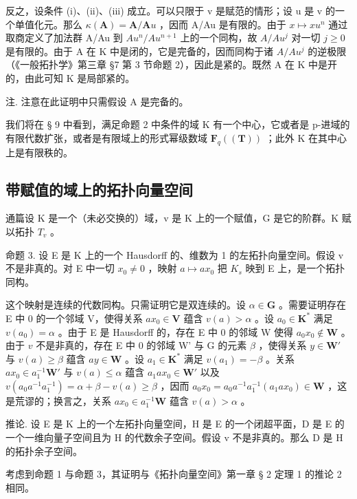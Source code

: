 反之，设条件 (i)、(ii)、(iii) 成立。可以只限于 v 是赋范的情形；设 u 是 v 的一个单值化元。那么 \(\kappa(\mathbf{A}) = \mathbf{A}/\mathbf{A}u\) ，因而 A/Au 是有限的。由于 \(x \mapsto xu^{n}\) 通过取商定义了加法群 A/Au 到 \(Au^{n}/Au^{n+1}\) 上的一个同构，故 \(A/Au^{j}\) 对一切 \(j \geqslant 0\) 是有限的。由于 A 在 K 中是闭的，它是完备的，因而同构于诸 \(A/Au^{j}\) 的逆极限（《一般拓扑学》第三章 §7 第 3 节命题 2），因此是紧的。既然 A 在 K 中是开的，由此可知 K 是局部紧的。

注. 注意在此证明中只需假设 A 是完备的。

我们将在 § 9 中看到，满足命题 2 中条件的域 K 有一个中心，它或者是 p-进域的有限代数扩张，或者是有限域上的形式幂级数域 \(\mathbf{F}_{q}((\mathbf{T}))\) ；此外 K 在其中心上是有限秩的。

\subsection{带赋值的域上的拓扑向量空间}

通篇设 K 是一个（未必交换的）域，v 是 K 上的一个赋值，G 是它的阶群。K 赋以拓扑 \(T_{v}\) 。

命题 3. 设 E 是 K 上的一个 Hausdorff 的、维数为 1 的左拓扑向量空间。假设 v 不是非真的。对 E 中一切 \(x_{0} \neq 0\) ，映射 \(a \mapsto ax_{0}\) 把 \(K_{s}\) 映到 E 上，是一个拓扑同构。

这个映射是连续的代数同构。只需证明它是双连续的。设 \(\alpha \in \mathbf{G}\) 。需要证明存在 E 中 0 的一个邻域 V，使得关系 \(ax_0 \in \mathbf{V}\) 蕴含 \(v(a) > \alpha\) 。设 \(a_0 \in \mathbf{K}^*\) 满足 \(v(a_0) = \alpha\) 。由于 E 是 Hausdorff 的，存在 E 中 0 的邻域 W 使得 \(a_0 x_0 \notin \mathbf{W}\) 。由于 \(v\) 不是非真的，存在 E 中 0 的邻域 W' 与 G 的元素 \(\beta\) ，使得关系 \(y \in \mathbf{W}'\) 与 \(v(a) \geqslant \beta\) 蕴含 \(ay \in \mathbf{W}\) 。设 \(a_1 \in \mathbf{K}^*\) 满足 \(v(a_1) = -\beta\) 。关系 \(ax_0 \in a_1^{-1} \mathbf{W}'\) 与 \(v(a) \leqslant \alpha\) 蕴含 \(a_1 ax_0 \in \mathbf{W}'\) 以及 \(v(a_0 a^{-1} a_1^{-1}) = \alpha + \beta - v(a) \geqslant \beta\) ，因而 \(a_0 x_0 = a_0 a^{-1} a_1^{-1}(a_1 ax_0) \in \mathbf{W}\) ，这是荒谬的；换言之，关系 \(ax_0 \in a_1^{-1} \mathbf{W}\) 蕴含 \(v(a) > \alpha\) 。

推论. 设 E 是 K 上的一个左拓扑向量空间，H 是 E 的一个闭超平面，D 是 E 的一个一维向量子空间且为 H 的代数余子空间。假设 v 不是非真的。那么 D 是 H 的拓扑余子空间。

考虑到命题 1 与命题 3，其证明与《拓扑向量空间》第一章 § 2 定理 1 的推论 2 相同。

